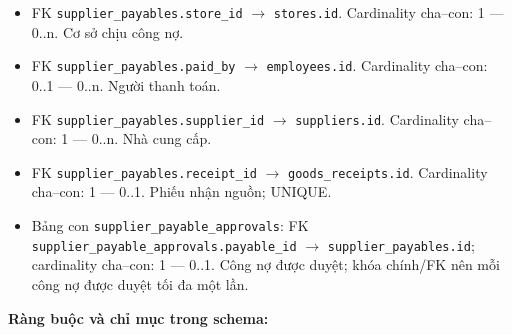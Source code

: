 \begin{itemize}

\item FK \texttt{supplier\_payables.store\_id} $\rightarrow$ \texttt{stores.id}. Cardinality cha--con: 1 — 0..n. Cơ sở chịu công nợ.

\item FK \texttt{supplier\_payables.paid\_by} $\rightarrow$ \texttt{employees.id}. Cardinality cha--con: 0..1 — 0..n. Người thanh toán.

\item FK \texttt{supplier\_payables.supplier\_id} $\rightarrow$ \texttt{suppliers.id}. Cardinality cha--con: 1 — 0..n. Nhà cung cấp.

\item FK \texttt{supplier\_payables.receipt\_id} $\rightarrow$ \texttt{goods\_receipts.id}. Cardinality cha--con: 1 — 0..1. Phiếu nhận nguồn; UNIQUE.

\item Bảng con \texttt{supplier\_payable\_approvals}: FK \texttt{supplier\_payable\_approvals.payable\_id} $\rightarrow$ \texttt{supplier\_payables.id}; cardinality cha--con: 1 — 0..1. Công nợ được duyệt; khóa chính/FK nên mỗi công nợ được duyệt tối đa một lần.

\end{itemize}

\textbf{Ràng buộc và chỉ mục trong schema:}

